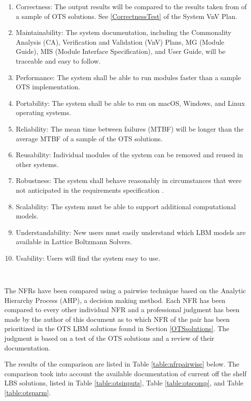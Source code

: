 \documentclass[12pt]{article}
\newcommand{\famname}{Lattice Boltzmann Solvers} %
\begin{document}
\begin{enumerate}
\item Correctness: The output results will be compared to the results taken from of a sample of OTS solutions. See \ref{CorrectnessTest} of the System VnV Plan.
\item Maintainability: The system documentation, including the Commonality Analysis (CA), Verification and Validation (VnV) Plans, MG (Module Guide), MIS (Module Interface Specification), and User Guide, will be traceable and easy to follow.
\item Performance: The system shall be able to run modules faster than a sample OTS implementation.
\item Portability: The system shall be able to run on macOS, Windows, and Linux operating systems.
\item Reliability: The mean time between failures (MTBF) will be longer than the average MTBF of a sample of the OTS solutions.
\item Reusability: Individual modules of the system can be removed and reused in other systems.
\item Robustness: The system shall behave reasonably in circumstances that were not anticipated in the requirements specification \cite{ghezzi1991fundamentals}.
\item Scalability: The system must be able to support additional computational models.
\item Understandability: New users must easily understand which LBM models are available in {\famname}.
\item Usability: Users will find the system easy to use.
\end{enumerate}

~\newpage

The NFRs have been compared using a pairwise technique based on the Analytic Hierarchy Process (AHP), a decision making method. Each NFR has been compared to every other individual NFR and a professional judgment has been made by the author of this document as to which NFR of the pair has been prioritized in the OTS LBM solutions found in Section \ref{OTSsolutions}. The judgment is based on a test of the OTS solutions and a review of their documentation.

The results of the comparison are listed in Table \ref{table:nfrpairwise} below. The comparison took into account the available documentation of current off the shelf LBS solutions, listed in Table \ref{table:otsinputs}, Table \ref{table:otscomp}, and Table \ref{table:otsparm}.
\\
\end{document}
